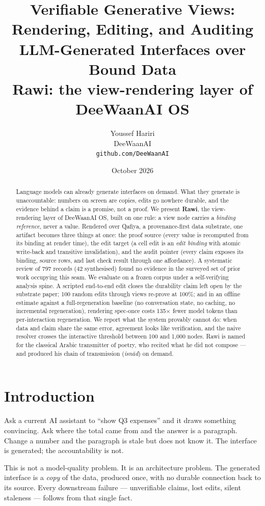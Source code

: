 \documentclass[11pt]{article}
\title{Verifiable Generative Views: Rendering, Editing, and Auditing\\LLM-Generated Interfaces over Bound Data\\[4pt]
\large Rawi: the view-rendering layer of DeeWaanAI OS}
\author{Youssef Hariri\\DeeWaanAI\\\texttt{github.com/DeeWaanAI}}
\date{October 2026}
\begin{document}
\maketitle

\begin{abstract}
Language models can already generate interfaces on demand. What they generate is
unaccountable: numbers on screen are copies, edits go nowhere durable, and the evidence
behind a claim is a promise, not a proof. We present \textbf{Rawi}, the view-rendering
layer of DeeWaanAI OS, built on one rule: a view node carries a \emph{binding reference},
never a value. Rendered over Qafiya, a provenance-first data substrate, one artifact
becomes three things at once: the proof source (every value is recomputed from its binding
at render time), the edit target (a cell edit is an \emph{edit binding} with atomic
write-back and transitive invalidation), and the audit pointer (every claim exposes its
binding, source rows, and last check result through one affordance). A systematic review
of 797 records (42 synthesised) found no evidence in the surveyed set of prior work
occupying this seam. We evaluate on a frozen corpus under a self-verifying analysis
spine. A scripted end-to-end edit closes the durability claim left open by the substrate
paper; 100 random edits through views re-prove at 100\%; and in an offline estimate
against a full-regeneration baseline (no conversation state, no caching, no incremental
regeneration), rendering spec-once costs 135$\times$ fewer model tokens than
per-interaction regeneration. We report what the system provably cannot do: when data
and claim share the same error, agreement looks like verification, and the naive resolver
crosses the interactive threshold between 100 and 1{,}000 nodes. Rawi is named for the
classical Arabic transmitter of poetry, who recited what he did not compose --- and
produced his chain of transmission (\emph{isn\=ad}) on demand.
\end{abstract}

\section{Introduction}

Ask a current AI assistant to ``show Q3 expenses'' and it draws something convincing. Ask
where the total came from and the answer is a paragraph. Change a number and the paragraph
is stale but does not know it. The interface is generated; the accountability is not.

This is not a model-quality problem. It is an architecture problem. The generated
interface is a \emph{copy} of the data, produced once, with no durable connection back to
its source. Every downstream failure --- unverifiable claims, lost edits, silent
staleness --- follows from that single fact.
\end{document}
